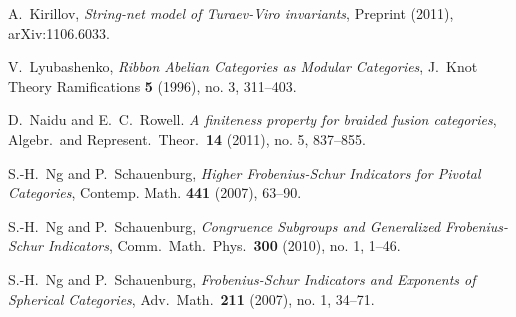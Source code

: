 \documentclass{amsart}
\begin{document}
\begin{thebibliography}{0}


 A.\ Kirillov, \emph{String-net model of {Turaev-Viro} invariants}, Preprint (2011), arXiv:1106.6033.






 V.\ Lyubashenko, \emph{Ribbon Abelian Categories as Modular Categories}, J.\ Knot Theory Ramifications \textbf{5} (1996), no. 3, 311--403.

  
 
 D.\ Naidu and E.\ C.\ Rowell. \emph{A finiteness property for braided fusion categories}, Algebr.\ and Represent.\ Theor.\ \textbf{14} (2011), no. 5, 837--855.

  S.-H.\ Ng and P.\ Schauenburg, \emph{Higher Frobenius-Schur Indicators for Pivotal Categories}, Contemp.
Math. \textbf{441} (2007), 63--90.
  
 S.-H.\ Ng and P.\ Schauenburg, \emph{Congruence Subgroups and Generalized {Frobenius-Schur} Indicators}, Comm.\ Math.\ Phys.\ \textbf{300} (2010), no. 1, 1--46.

 S.-H.\ Ng and P.\ Schauenburg, \emph{{Frobenius-Schur} Indicators and Exponents of Spherical Categories}, Adv.\ Math.\ \textbf{211} (2007), no. 1, 34--71.


\end{thebibliography}
\end{document}
